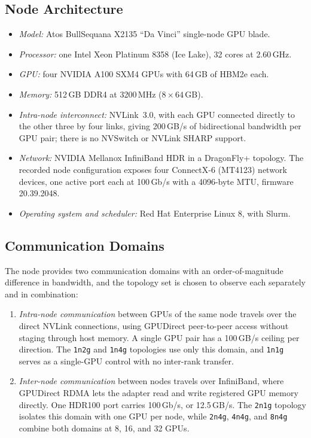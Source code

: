 \subsection{Node Architecture}

\begin{itemize}
    \item \emph{Model:} Atos BullSequana X2135 ``Da Vinci'' single-node GPU blade.
    \item \emph{Processor:} one Intel Xeon Platinum 8358 (Ice Lake), 32 cores at 2.60\,GHz.
    \item \emph{GPU:} four NVIDIA A100 SXM4 GPUs with 64\,GB of HBM2e each.
    \item \emph{Memory:} 512\,GB \ac{DDR4} at 3200\,MHz ($8 \times 64$\,GB).
    \item \emph{Intra-node interconnect:} NVLink~3.0, with each GPU connected directly to the other three by four links, giving 200\,GB/s of bidirectional bandwidth per GPU pair; there is no NVSwitch or NVLink SHARP support.
    \item \emph{Network:} NVIDIA Mellanox InfiniBand \ac{HDR} in a DragonFly+ topology. The recorded node configuration exposes four ConnectX-6 (MT4123) network devices, one active port each at 100\,Gb/s with a 4096-byte \ac{MTU}, firmware 20.39.2048.
    \item \emph{Operating system and scheduler:} Red Hat Enterprise Linux 8, with Slurm.
\end{itemize}

\subsection{Communication Domains}

The node provides two communication domains with an order-of-magnitude difference in bandwidth, and the topology set is chosen to observe each separately and in combination:

\begin{enumerate}
    \item \emph{Intra-node communication} between GPUs of the same node travels over the direct NVLink connections, using GPUDirect peer-to-peer access without staging through host memory. A single GPU pair has a 100\,GB/s ceiling per direction. The \texttt{1n2g} and \texttt{1n4g} topologies use only this domain, and \texttt{1n1g} serves as a single-GPU control with no inter-rank transfer.
    \item \emph{Inter-node communication} between nodes travels over InfiniBand, where GPUDirect RDMA lets the adapter read and write registered GPU memory directly. One HDR100 port carries 100\,Gb/s, or 12.5\,GB/s. The \texttt{2n1g} topology isolates this domain with one GPU per node, while \texttt{2n4g}, \texttt{4n4g}, and \texttt{8n4g} combine both domains at 8, 16, and 32 GPUs.
\end{enumerate}

